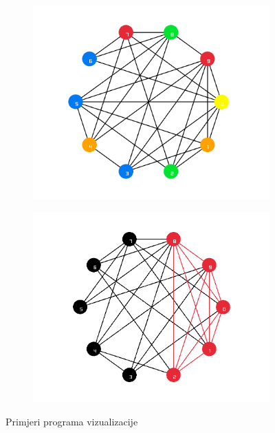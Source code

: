 \documentclass[diplomskirad]{fer}
\begin{document}
\begin{figure}
  \centering
  \begin{subfigure}[b]{0.4\linewidth}
    \includegraphics[scale=0.25]{images/color.png}
  \end{subfigure}
  \hfill
  \begin{subfigure}[b]{0.4\linewidth}
    \includegraphics[scale=0.25]{images/clique.png}
  \end{subfigure}
  \caption{Primjeri programa vizualizacije}
  \label{fig:visualize}
\end{figure}
\end{document}
